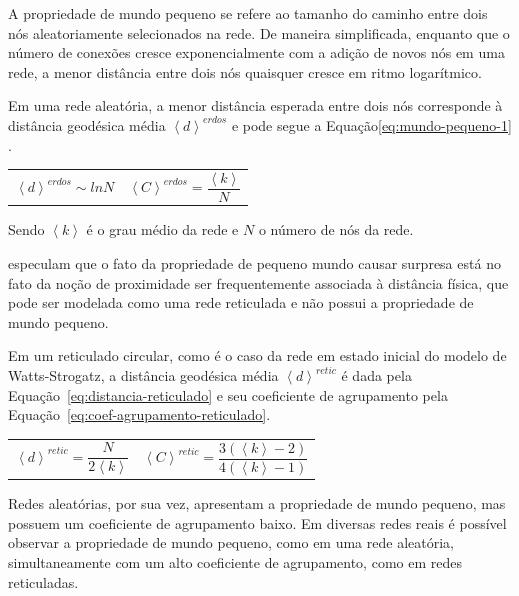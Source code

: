 \documentclass[12pt,a4paper]{article}
\theoremstyle{hypo}
\newcommand{\avg}[1]{\left\langle #1 \right\rangle} %
\begin{document}
A propriedade de mundo pequeno se refere ao tamanho do caminho entre dois nós aleatoriamente selecionados na rede. De maneira simplificada, enquanto que o número de conexões cresce exponencialmente com a adição de novos nós em uma rede, a menor distância entre dois nós quaisquer cresce em ritmo logarítmico. 

Em uma rede aleatória, a menor distância esperada entre dois nós corresponde à distância geodésica média $\avg{d}^\textit{erdos}$ e pode segue a Equação\ref{eq:mundo-pequeno-1} \cite{Barabasi2016-rn}.

\noindent
\begin{tabularx}{\linewidth}{@{}XX@{}}
    \begin{equation} \label{eq:mundo-pequeno-1}
        \avg{d}^\textit{erdos} \sim ln N
    \end{equation} &
    \begin{equation} \label{eq:coef-agrupamento-erdos}
        \avg{C}^\textit{erdos} = \frac{\avg{k}}{N}
    \end{equation}
\end{tabularx}

Sendo $\avg{k}$ é o grau médio da rede e $N$ o número de nós da rede.

 especulam que o fato da propriedade de pequeno mundo causar surpresa está no fato da noção de proximidade ser frequentemente associada à distância física, que pode ser modelada como uma rede reticulada e não possui a propriedade de mundo pequeno.

Em um reticulado circular, como é o caso da rede em estado inicial do modelo de Watts-Strogatz, a distância geodésica média $\avg{d}^ \textit{retic}$ é dada pela Equação~\ref{eq:distancia-reticulado} e seu coeficiente de agrupamento pela Equação~\ref{eq:coef-agrupamento-reticulado}.

\noindent
\begin{tabularx}{\linewidth}{@{}XX@{}}
    \begin{equation} \label{eq:distancia-reticulado}
        \avg{d}^\textit{retic} = \frac{N}{2\avg{k}}
    \end{equation} &
    \begin{equation} \label{eq:coef-agrupamento-reticulado}
        \avg{C}^\textit{retic} = \frac{3(\avg{k} - 2)}{4 (\avg{k} -1 )}
    \end{equation}
\end{tabularx}

Redes aleatórias, por sua vez, apresentam a propriedade de mundo pequeno, mas possuem um coeficiente de agrupamento baixo. Em diversas redes reais é possível observar a propriedade de mundo pequeno, como em uma rede aleatória, simultaneamente com um alto coeficiente de agrupamento, como em redes reticuladas.
\end{document}
